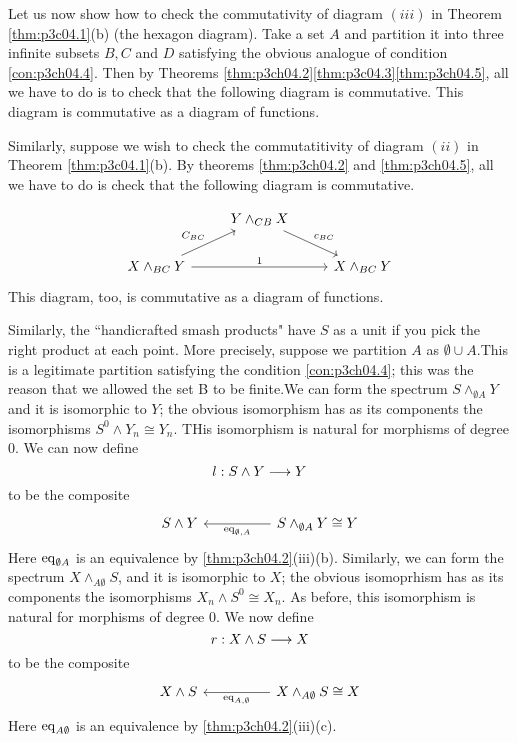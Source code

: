\documentclass[../main]{subfiles}
\begin{document}
Let us now show how to check the commutativity of diagram $(iii)$ in Theorem \ref{thm:p3c04.1}(b) (the hexagon diagram). Take a set $A$ and partition it into three infinite subsets $B,C$ and $D$ satisfying the obvious analogue of condition \ref{con:p3ch04.4}. Then by Theorems \ref{thm:p3ch04.2}\ref{thm:p3c04.3}\ref{thm:p3ch04.5}, all we have to do is to check that the following diagram is commutative.
This diagram is commutative as a diagram of functions.

Similarly, suppose we wish to check the commutatitivity of diagram $(ii)$ in Theorem \ref{thm:p3c04.1}(b). By theorems \ref{thm:p3ch04.2} and \ref{thm:p3ch04.5}, all we have to do is check that the following diagram is commutative.

$$\begin{tikzcd}
& Y\wedge_{CB} X\arrow[rd,"c_{BC}"] & \\
X\wedge_{BC} Y \arrow[ru,"C_{BC}"] \arrow[rr, "1"] && X\wedge_{BC}Y
\end{tikzcd}$$
This diagram, too, is commutative as a diagram of functions.

Similarly, the “handicrafted smash products" have $S$ as a unit if
you pick the right product at each point. More precisely, suppose we
partition $A$ as $\emptyset\cup A$.This is a legitimate partition satisfying the
condition \ref{con:p3ch04.4}; this was the reason that we allowed the set B to be finite.We can form the spectrum $S\wedge_{\emptyset A}Y$ and it is isomorphic to $Y$; the obvious isomorphism has as its components the isomorphisms $S^0\wedge Y_n \cong Y_n$. THis isomorphism is natural for morphisms of degree $0$. We can now define $$ l:S\wedge Y\overset{}{\longrightarrow}Y$$
to be the composite $$\begin{tikzcd}
S\wedge Y &&S\wedge_{\emptyset A}Y\cong Y\arrow[ll,"\te{eq}_{\emptyset,A}"]
\end{tikzcd}$$
Here $\mathop{\mathrm{eq}}_{\emptyset A}$ is an equivalence by \ref{thm:p3ch04.2}(iii)(b). Similarly, we can form the spectrum $X\wedge_{A\emptyset} S$, and it is isomorphic to $X$; the obvious isomoprhism has as its components the isomorphisms $X_n\wedge S^0 \cong X_n$. As before, this isomorphism is natural for morphisms of degree $0$. We now define $$ r:X\wedge S\overset{}{\longrightarrow}X$$
to be the composite $$\begin{tikzcd}
X\wedge S &&X\wedge_{A\emptyset }S\cong X\arrow[ll,"\te{eq}_{A,\emptyset}"]
\end{tikzcd} $$
Here $\mathop{\mathrm{eq}}_{A\emptyset}$ is an equivalence by \ref{thm:p3ch04.2}(iii)(c).
\end{document}
